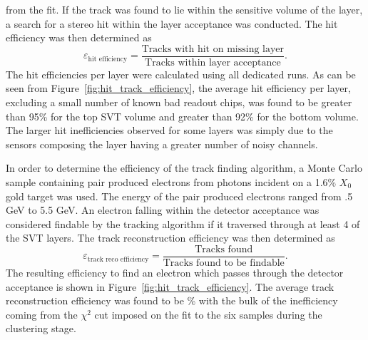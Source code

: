 from the fit. If the track was found to lie within the sensitive volume
of the layer, a search for a stereo hit within the layer acceptance was 
conducted.  The hit efficiency was then determined as
\[
    \varepsilon_{\mbox{hit efficiency}} = \frac{\mbox{Tracks with hit on missing layer}}
                                            {\mbox{Tracks within layer acceptance}}.
\]
The hit efficiencies per layer were calculated using all dedicated runs. As 
can be seen from Figure~\ref{fig:hit_track_efficiency}, the average hit efficiency
per layer, excluding a small number of known bad readout chips, was found to be greater than
95\% for the top SVT volume and greater than 92\% for the bottom volume.  The 
larger hit inefficiencies observed for some layers was simply due to the 
sensors composing the layer having a greater number of noisy channels.


In order to determine the efficiency of the track finding algorithm, a Monte
Carlo sample containing pair produced electrons from photons incident on 
a 1.6\% $X_0$ gold target was used.  The energy of the pair produced electrons
ranged from .5 GeV to 5.5 GeV. An electron falling within the detector 
acceptance was considered findable by the tracking algorithm if it 
traversed through at least 4 of the SVT layers. The track reconstruction
efficiency was then determined as
\[
    \varepsilon_{\mbox{track reco efficiency}} = \frac{\mbox{Tracks found}}
                                            {\mbox{Tracks found to be findable}}.
\]
The resulting efficiency to find an electron which passes through the detector
acceptance is shown in Figure~\ref{fig:hit_track_efficiency}. The average track
reconstruction efficiency was found to be \% with the bulk of the inefficiency
coming from the $\chi^2$ cut imposed on the fit to the six samples during
the clustering stage.


